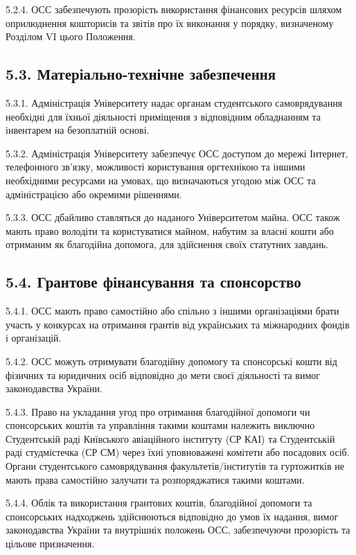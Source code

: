     5.2.4. ОСС забезпечують прозорість використання фінансових ресурсів шляхом оприлюднення кошторисів та звітів про їх виконання у порядку, визначеному Розділом VI цього Положення.

\subsection*{5.3. Матеріально-технічне забезпечення}
    5.3.1. Адміністрація Університету надає органам студентського самоврядування необхідні для їхньої діяльності приміщення з відповідним обладнанням та інвентарем на безоплатній основі.

    5.3.2. Адміністрація Університету забезпечує ОСС доступом до мережі Інтернет, телефонного зв'язку, можливості користування оргтехнікою та іншими необхідними ресурсами на умовах, що визначаються угодою між ОСС та адміністрацією або окремими рішеннями.

    5.3.3. ОСС дбайливо ставляться до наданого Університетом майна. ОСС також мають право володіти та користуватися майном, набутим за власні кошти або отриманим як благодійна допомога, для здійснення своїх статутних завдань.

\subsection*{5.4. Грантове фінансування та спонсорство}
    5.4.1. ОСС мають право самостійно або спільно з іншими організаціями брати участь у конкурсах на отримання грантів від українських та міжнародних фондів і організацій.

    5.4.2. ОСС можуть отримувати благодійну допомогу та спонсорські кошти від фізичних та юридичних осіб відповідно до мети своєї діяльності та вимог законодавства України.

    5.4.3. Право на укладання угод про отримання благодійної допомоги чи спонсорських коштів та управління такими коштами належить виключно Студентській раді Київського авіаційного інституту (СР КАІ) та Студентській раді студмістечка (СР СМ) через їхні уповноважені комітети або посадових осіб. Органи студентського самоврядування факультетів/інститутів та гуртожитків не мають права самостійно залучати та розпоряджатися такими коштами.

    5.4.4. Облік та використання грантових коштів, благодійної допомоги та спонсорських надходжень здійснюються відповідно до умов їх надання, вимог законодавства України та внутрішніх положень ОСС, забезпечуючи прозорість та цільове призначення.

